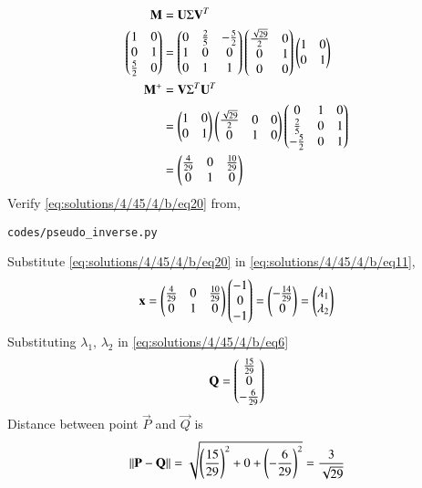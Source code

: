 \begin{align}
	\label{eq:solutions/4/45/4/b/eq16}\mathbf{M} &= \mathbf{U}\Sigma\mathbf{V}^T\\
	\label{eq:solutions/4/45/4/b/eq17}\begin{pmatrix}1 & 0\\0 & 1\\\frac{5}{2} & 0\end{pmatrix} &= \begin{pmatrix}0 & \frac{2}{5} & -\frac{5}{2}\\1 & 0 & 0\\0 & 1 & 1\end{pmatrix}\begin{pmatrix}\frac{\sqrt{29}}{2} & 0 \\0 & 1\\0 & 0\end{pmatrix} \begin{pmatrix}1 & 0\\0 & 1\end{pmatrix}\\
	\label{eq:solutions/4/45/4/b/eq18}\mathbf{M}^{+} &= \mathbf{V}\Sigma^T\mathbf{U}^T\\
	\label{eq:solutions/4/45/4/b/eq19}&= \begin{pmatrix}1 & 0\\0 & 1\end{pmatrix}\begin{pmatrix}\frac{\sqrt{29}}{2} & 0 & 0\\0 & 1 & 0\end{pmatrix}\begin{pmatrix}0 & 1 & 0\\\frac{2}{5} & 0 & 1\\-\frac{5}{2} & 0 & 1\end{pmatrix}\\
	\label{eq:solutions/4/45/4/b/eq20}&=\begin{pmatrix}\frac{4}{29} & 0 & \frac{10}{29}\\0 & 1 & 0\end{pmatrix}
\end{align}
Verify \eqref{eq:solutions/4/45/4/b/eq20} from,
\begin{lstlisting}
codes/pseudo_inverse.py
\end{lstlisting}
Substitute \eqref{eq:solutions/4/45/4/b/eq20} in \eqref{eq:solutions/4/45/4/b/eq11},
\begin{align}\label{eq:solutions/4/45/4/b/23}
	\mathbf{x} = \begin{pmatrix}\frac{4}{29} & 0 & \frac{10}{29}\\0 & 1 & 0\end{pmatrix}\begin{pmatrix}-1\\0\\-1\end{pmatrix} = \begin{pmatrix}-\frac{14}{29}\\0\end{pmatrix} = \begin{pmatrix}\lambda_1 \\ \lambda_2\end{pmatrix}
\end{align}
Substituting $\lambda_1$, $\lambda_2$ in \eqref{eq:solutions/4/45/4/b/eq6}
\begin{equation}
	\mathbf{Q} = \begin{pmatrix}\frac{15}{29}\\0\\-\frac{6}{29}\end{pmatrix}
\end{equation}
Distance between point $\vec{P}$ and $\vec{Q}$ is
\begin{align}
	\left\lVert\mathbf{P}-\mathbf{Q}\right\rVert = \sqrt{\left(\frac{15}{29}\right)^2 + 0 + \left(-\frac{6}{29}\right)^2} = \frac{3}{\sqrt{29}}
\end{align}
